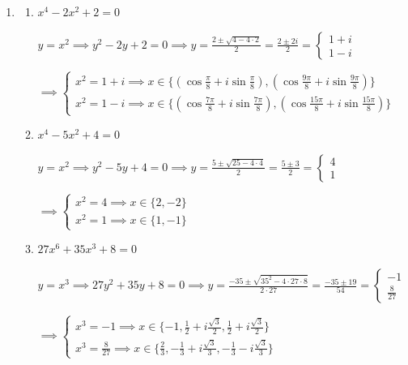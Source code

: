 \documentclass[12pt, openright, a4paper, twoside, english, brazil]{article}
\newenvironment{qmitem}{
  \color{black}
\item
\begin{enumerate}[\bfseries a)]}{
\end{enumerate}\vspace{10pt}}
\newcommand{\cis}[1]{\displaystyle(\cos#1+i\sin#1)}
\begin{document}
\begin{enumerate}[\bfseries 1.]
\begin{qmitem}
$\implies
\begin{cases}x^3=-8\implies
  x=2\cis{\frac{2k\pi+\pi}{3}}\in\{1+i\sqrt3,-2,1-i\sqrt3\}\\x^3=-1\implies
  x=1\cis{\frac{2k\pi+\pi}{3}}\in\{\frac12+i\frac{\sqrt3}{2},-1,\frac12-i\frac{\sqrt3}{2}\}
\end{cases}$

\color{black}
\item $x^4-2x^2+2=0$
\color{red}

$\displaystyle y=x^2\implies y^2-2y+2=0\implies y=\frac{2\pm\sqrt{4-4\cdot
2}}{2}=\frac{2\pm2i}{2}=
\begin{cases}1+i\\1-i
\end{cases}$

$\implies
\begin{cases}x^2=1+i\implies
  x\in\{\cis{\frac{\pi}{8}},\cis{\frac{9\pi}{8}}\}\\x^2=1-i\implies
  x\in\{\cis{\frac{7\pi}{8}},\cis{\frac{15\pi}{8}}\}
\end{cases}$

\color{black}
\item $x^4-5x^2+4=0$
\color{red}

$\displaystyle y=x^2\implies y^2-5y+4=0\implies y=\frac{5\pm\sqrt{25-4\cdot
4}}{2}=\frac{5\pm3}{2}=
\begin{cases}4\\1
\end{cases}$

$\implies
\begin{cases}x^2=4\implies
  x\in\{2,-2\}\\
  x^2=1\implies
  x\in\{1,-1\}
\end{cases}$

\color{black}
\item $27x^6+35x^3+8=0$
\color{red}

$\displaystyle y=x^3\implies 27y^2+35y+8=0\implies
y=\frac{-35\pm\sqrt{35^2-4\cdot
27\cdot 8}}{2\cdot 27}=\frac{-35\pm19}{54}=
\begin{cases}-1\\\frac{8}{27}
\end{cases}$

$\implies
\begin{cases}x^3=-1\implies
  x\in\{-1,\frac12+i\frac{\sqrt3}{2},\frac12+i\frac{\sqrt3}{2}\}\\
  x^3=\frac{8}{27}\implies
  x\in\{\frac23,-\frac13+i\frac{\sqrt3}{3},-\frac13-i\frac{\sqrt3}{3}\}
\end{cases}$


\end{qmitem}
\end{enumerate}
\end{document}

